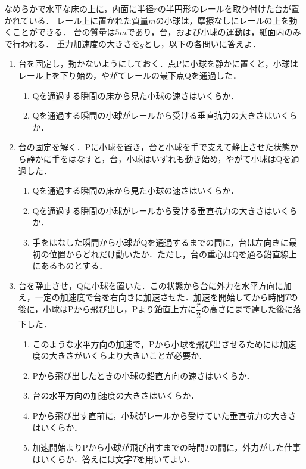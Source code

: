 なめらかで水平な床の上に，内面に半径$r$の半円形のレールを取り付けた台が置かれている．
レール上に置かれた質量$m$の小球は，摩擦なしにレールの上を動くことができる．
台の質量は$5m$であり，台，および小球の運動は，紙面内のみで行われる．
重力加速度の大きさを$g$とし，以下の各問いに答えよ．
\begin{enumerate}[label={\textbf{問\arabic*}}]
  \item {\hzw}台を固定し，動かないようにしておく．点Pに小球を静かに置くと，小球はレール上を下り始め，やがてレールの最下点Qを通過した．
  \begin{enumerate}[(1)]
    \item {\hzw}Qを通過する瞬間の床から見た小球の速さはいくらか．
    \item {\hzw}Qを通過する瞬間の小球がレールから受ける垂直抗力の大きさはいくらか．
  \end{enumerate}
  \item {\hzw}台の固定を解く．Pに小球を置き，台と小球を手で支えて静止させた状態から静かに手をはなすと，台，小球はいずれも動き始め，やがて小球はQを通過した．
  \begin{enumerate}[(1), resume]
    \item {\hzw}Qを通過する瞬間の床から見た小球の速さはいくらか．
    \item {\hzw}Qを通過する瞬間の小球がレールから受ける垂直抗力の大きさはいくらか．
    \item {\hzw}手をはなした瞬間から小球がQを通過するまでの間に，台は左向きに最初の位置からどれだけ動いたか．ただし，台の重心はQを通る鉛直線上にあるものとする．
  \end{enumerate}
  \item {\hzw}台を静止させ，Qに小球を置いた．この状態から台に外力を水平方向に加え，一定の加速度で台を右向きに加速させた．加速を開始してから時間$T$の後に，小球はPから飛び出し，Pより鉛直上方に$\dfrac{r}{2}$の高さにまで達した後に落下した．
  \begin{enumerate}[(1), resume]
    \item {\hzw}このような水平方向の加速で，Pから小球を飛び出させるためには加速度の大きさがいくらより大きいことが必要か．
    \item {\hzw}Pから飛び出したときの小球の鉛直方向の速さはいくらか．
    \item {\hzw}台の水平方向の加速度の大きさはいくらか．
    \item {\hzw}Pから飛び出す直前に，小球がレールから受けていた垂直抗力の大きさはいくらか．
    \item {\hzw}加速開始よりPから小球が飛び出すまでの時間$T$の間に，外力がした仕事はいくらか．答えには文字$T$を用いてよい．
  \end{enumerate}

\end{enumerate}




